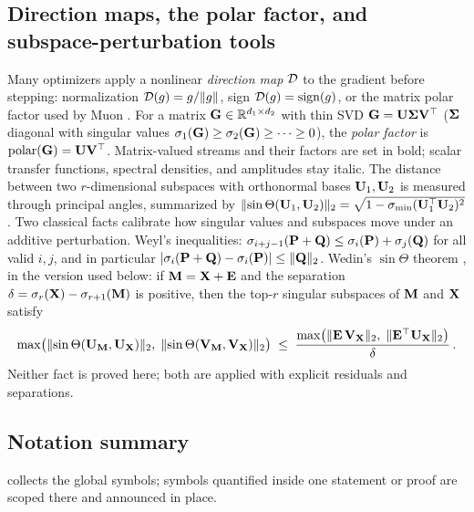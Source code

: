 \documentclass[11pt,a4paper]{article}
\theoremstyle{remark}
\DeclareMathOperator{\polar}{polar}
\begin{document}
\subsection{Direction maps, the polar factor, and subspace-perturbation tools}
\label{sec:svdtools}

Many optimizers apply a nonlinear \emph{direction map} $\mathcal{D}$ to the gradient before stepping: normalization $\mathcal{D}(g)=g/\lVert g\rVert$, sign $\mathcal{D}(g)=\operatorname{\mathrm{sign}}(g)$, or the matrix polar factor used by Muon \citep{jordan2024muon}.
For a matrix $\mathbf{G}\in\mathbb{R}^{d_1\times d_2}$ with thin SVD $\mathbf{G}=\mathbf{U}\bm{\Sigma}\mathbf{V}^\top$ ($\bm{\Sigma}$ diagonal with singular values $\sigma_1(\mathbf{G})\ge\sigma_2(\mathbf{G})\ge\dots\ge0$), the \emph{polar factor} is $\polar(\Gbf)=\Ubf\Vbf^\top$.
Matrix-valued streams and their factors are set in bold; scalar transfer functions, spectral densities, and amplitudes stay italic.
The distance between two $r$-dimensional subspaces with orthonormal bases $\mathbf{U}_1,\mathbf{U}_2$ is measured through principal angles, summarized by $\lVert\sin\Theta(\mathbf{U}_1,\mathbf{U}_2)\rVert_2=\sqrt{1-\sigma_{\min}(\mathbf{U}_1^\top\mathbf{U}_2)^2}$.
Two classical facts calibrate how singular values and subspaces move under an additive perturbation.
Weyl's inequalities: $\sigma_{i+j-1}(\mathbf{P}+\mathbf{Q})\le\sigma_i(\mathbf{P})+\sigma_j(\mathbf{Q})$ for all valid $i,j$, and in particular $\lvert\sigma_i(\mathbf{P}+\mathbf{Q})-\sigma_i(\mathbf{P})\rvert\le\lVert\mathbf{Q}\rVert_2$.
Wedin's $\sin\Theta$ theorem \citep{wedin1972perturbation}, in the version used below: if $\mathbf{M}=\mathbf{X}+\mathbf{E}$ and the separation $\delta=\sigma_r(\mathbf{X})-\sigma_{r+1}(\mathbf{M})$ is positive, then the top-$r$ singular subspaces of $\mathbf{M}$ and $\mathbf{X}$ satisfy
\[
\max\bigl(\lVert\sin\Theta(\mathbf{U}_{\mathbf{M}},\mathbf{U}_{\mathbf{X}})\rVert_2,\;\lVert\sin\Theta(\mathbf{V}_{\mathbf{M}},\mathbf{V}_{\mathbf{X}})\rVert_2\bigr)
\;\le\;\frac{\max\bigl(\lVert\mathbf{E}\,\mathbf{V}_{\mathbf{X}}\rVert_2,\;\lVert\mathbf{E}^\top\mathbf{U}_{\mathbf{X}}\rVert_2\bigr)}{\delta}\,.
\]
Neither fact is proved here; both are applied with explicit residuals and separations.

\subsection{Notation summary}
\label{sec:notation}

 collects the global symbols; symbols quantified inside one statement or proof are scoped there and announced in place.
\end{document}
